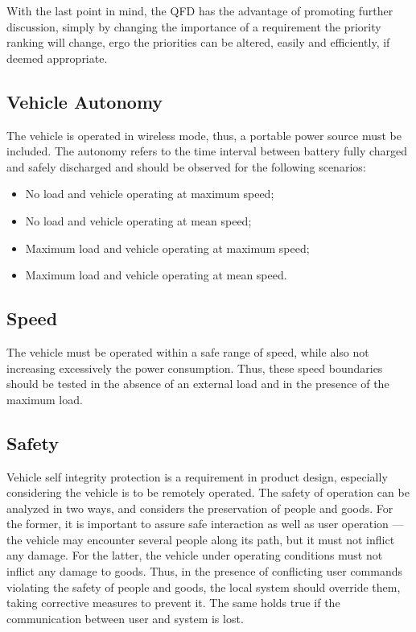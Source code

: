 With the last point in mind, the QFD has the advantage of promoting further
discussion, simply by changing the importance of a requirement the priority ranking will change, ergo
the priorities can be altered, easily and efficiently, if deemed appropriate.
\newpage
%
\subsection{Vehicle Autonomy}%
\label{sec:autonomy-specs}
The vehicle is operated in wireless mode, thus, a portable power source must be included. The autonomy refers to the time interval between battery fully charged and safely discharged and should be observed for the following scenarios:
\begin{itemize}
\item No load and vehicle operating at maximum speed;
\item No load and vehicle operating at mean speed;
\item Maximum load and vehicle operating at maximum speed;
\item Maximum load and vehicle operating at mean speed.
\end{itemize}
\subsection{Speed}%
\label{sec:speed-tests}
The vehicle must be operated within a safe range of speed, while also not increasing excessively the power consumption. Thus, these speed boundaries should be tested in the absence of an external load and in the presence of the maximum load.
\subsection{Safety}%
\label{sec:org83942c3}
Vehicle self integrity protection is a requirement in product design, especially considering the vehicle is to
be remotely operated. The safety of operation can be analyzed in two ways, and considers the
preservation of people and goods. For the former, it is important to assure safe interaction as well as user operation --- the vehicle may encounter
several people along its path, but it must not inflict any damage. For the
latter, the vehicle under operating conditions must not inflict any damage to
goods. Thus, in the presence of conflicting user commands violating the safety
of people and goods, the local system should override them, taking corrective
measures to prevent it. The same holds true if the communication between user
and system is lost.

